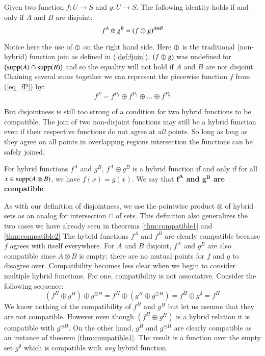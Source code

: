 \begin{theorem}
	\label{thm:compatible2}
	Given two function $f : U \to S$ and $g : U \to S$. The following identity holds if and only if $A$ and $B$ are disjoint:
	\begin{equation}
		f^A \oplus g^B = (f \varobar g)^{A \oplus B}
	\end{equation}
\end{theorem}


Notice here the use of $\varobar$ on the right hand side.
Here $\varobar$ is the traditional (non-hybrid) function join as defined in (\ref{def:fjoin}).
$(f \varobar g)$ was undefined for $\left( \text{supp}(A) \cap \text{supp}(B) \right)$ 
and so the equality will not hold if $A$ and $B$ are not disjoint.
Chaining several sums together we can represent the piecewise function $f$ from (\ref{eq_fP}) by:
\begin{equation*}
 	f^P = f^{P_1} \oplus f^{P_2} \oplus \ldots \oplus f^{P_n}
\end{equation*}



But disjointness is still too strong of a condition for two hybrid functions to be compatible.
The join of two non-disjoint functions may still be a hybrid function 
even if their respective functions do not agree at \emph{all} points.
So long as long as they agree on all points in overlapping regions intersection the functions can be safely joined.


\begin{definition}
	For hybrid functions $f^A$ and $g^B$, $f^A \oplus g^B$ is a hybrid function
	if and only if for all $x \in \text{supp} (A \otimes B)$, we have $f(x) = g(x)$.
	We say that \textbf{$\boldsymbol{f^A}$ and $\boldsymbol{g^B}$ are compatible}.
\end{definition}


As with our definition of disjointness, we use the pointwise product $\otimes$ 
of hybrid sets as an analog for intersection $\cap$ of sets.
This definition also generalizes the two cases we have already seen in theorems 
\ref{thm:compatible1} and \ref{thm:compatible2}
The hybrid functions $f^A$ and $f^B$ are clearly compatible because $f$ agrees with itself everywhere.
For $A$ and $B$ disjoint, $f^A$ and $g^B$ are also compatible since $A \otimes B$ is empty;
there are no mutual points for $f$ and $g$ to disagree over.
Compatibility becomes less clear when we begin to consider multiple hybrid functions.
For one, compatibility is not associative.
Consider the following sequence:
\begin{equation*}
	(f^H \oplus g^H) \oplus g^{\ominus H} 
	= f^H \oplus (g^H \oplus g^{\ominus H}) 
	= f^H \oplus g^\emptyset = f^H
\end{equation*}
We know nothing of the compatibility of $f^H$ and $g^H$ but let us assume that they are not compatible.
However even though $(f^H \oplus g^H)$ is a hybrid relation it is compatible with $g^{\ominus H}$.
On the other hand, $g^H$ and $g^{\ominus H}$ are clearly compatible as an instance of theorem \ref{thm:compatible1}.
The result is a function over the empty set $g^{\emptyset}$ which is compatible with \emph{any} hybrid function.




